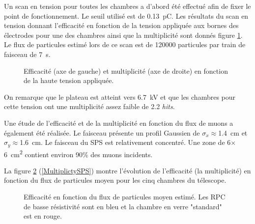 Un scan en tension pour toutes les chambres a d'abord été effectué afin de fixer le point de fonctionnement. Le seuil utilisé est de \SI{0.13}{\pico\coulomb}. Les résultats du scan en tension donnant l’efficacité en fonction de la tension appliquée aux bornes des électrodes pour une des chambres ainsi que la multiplicité sont donnés figure \ref{HVSPS}. Le flux de particules estimé lors de ce scan est de \num{120000} particules par train de faisceau de \SI{7}{\second}.

\begin{figure}[!ht]
	\centering
	\caption{Efficacité (axe de gauche) et multiplicité (axe de droite) en fonction de la haute tension appliquée.}
	\label{HVSPS}
\end{figure}

On remarque que le plateau est atteint vers \SI{6.7}{\kilo\volt} et que les chambres pour cette tension ont une multiplicité assez faible de \num{2.2} \textit{hits}. 

Une étude de l'efficacité et de la multiplicité en fonction du flux de muons a également été réalisée. Le faisceau présente un profil Gaussien de $\sigma_{x}\approx$\SI{1.4}{\centi\meter} et $\sigma_{y}\approx$\SI{1.6}{\centi\meter}. Le faisceau du SPS est relativement concentré. Une zone de \num{6}$\times$\SI{6}{\square\centi\meter} contient environ \num{90}\% des muons incidents.

La figure \ref{RateSPS} (\ref{MultiplictySPS}) montre l'évolution de l'efficacité (la multiplicité) en fonction du flux de particules moyen pour les cinq chambres du télescope.

\begin{figure}[!ht]
	\centering
	\caption{Efficacité en fonction du flux de particules moyen estimé. Les RPC de basse résistivité sont en bleu et la chambre en verre "standard" est en rouge.}
	\label{RateSPS}
\end{figure}

\newpage


